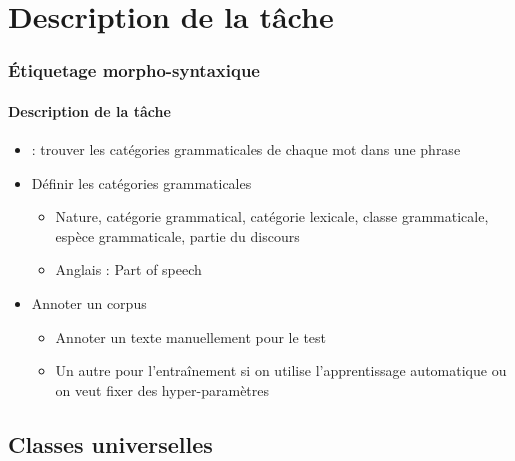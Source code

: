 \documentclass[xcolor=table]{beamer}
\begin{document}
\section{Description de la tâche}

\begin{frame}
\frametitle{Étiquetage morpho-syntaxique}
\framesubtitle{Description de la tâche}


\begin{itemize}
	\item {} : trouver les catégories grammaticales de chaque mot dans une phrase
	\item Définir les catégories grammaticales
	\begin{itemize}
		\item Nature, catégorie grammatical, catégorie lexicale, classe grammaticale, espèce grammaticale, partie du discours
		\item Anglais : Part of speech 
	\end{itemize}
	\item Annoter un corpus
	\begin{itemize}
		\item Annoter un texte manuellement pour le test
		\item Un autre pour l'entraînement si on utilise l'apprentissage automatique ou on veut fixer des hyper-paramètres
	\end{itemize}
\end{itemize}

\end{frame}

\subsection{Classes universelles}
\end{document}
